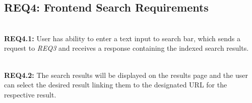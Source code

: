 \subsection{REQ4: Frontend Search Requirements}

\textbf{\\REQ4.1:} User has ability to enter a text input to search bar, which sends a request to \textit{REQ3} and receives a response containing the indexed search results.\par

\textbf{\\REQ4.2:} The search results will be displayed on the results page and the user can select the desired result linking them to the designated URL for the respective result.\par

